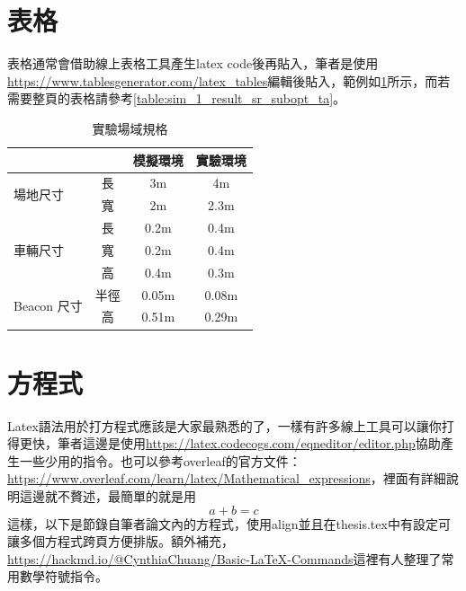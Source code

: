 
\section{表格}
\label{sec:table}

表格通常會借助線上表格工具產生latex code後再貼入，筆者是使用\url{https://www.tablesgenerator.com/latex_tables}編輯後貼入，範例如\cref{table:exp_size}所示，而若需要整頁的表格請參考\cref{table:sim_1_result_sr_subopt_ta}。

\begin{table}[htbp]
\caption{實驗場域規格}
\label{table:exp_size}
\setlength{\tabcolsep}{7mm}
\begin{tabular}{lccc}
\hline
                           &    & 模擬環境  & 實驗環境  \\ \hline
\multirow{2}{*}{場地尺寸}      & 長  & 3m    & 4m    \\
                           & 寬  & 2m    & 2.3m  \\ \hline
\multirow{3}{*}{車輛尺寸}      & 長  & 0.2m  & 0.4m  \\
                           & 寬  & 0.2m  & 0.4m  \\
                           & 高  & 0.4m  & 0.3m  \\ \hline
\multirow{2}{*}{Beacon 尺寸} & 半徑 & 0.05m & 0.08m \\
                           & 高  & 0.51m & 0.29m \\ \hline
\end{tabular}
\end{table}

\section{方程式}
\label{sec:equation}

Latex語法用於打方程式應該是大家最熟悉的了，一樣有許多線上工具可以讓你打得更快，筆者這邊是使用\url{https://latex.codecogs.com/eqneditor/editor.php}協助產生一些少用的指令。也可以參考overleaf的官方文件：\url{https://www.overleaf.com/learn/latex/Mathematical_expressions}，裡面有詳細說明這邊就不贅述，最簡單的就是用$$a+b=c$$這樣，以下是節錄自筆者論文內的方程式，使用align並且在thesis.tex中有設定可讓多個方程式跨頁方便排版。額外補充，\url{https://hackmd.io/@CynthiaChuang/Basic-LaTeX-Commands}這裡有人整理了常用數學符號指令。


